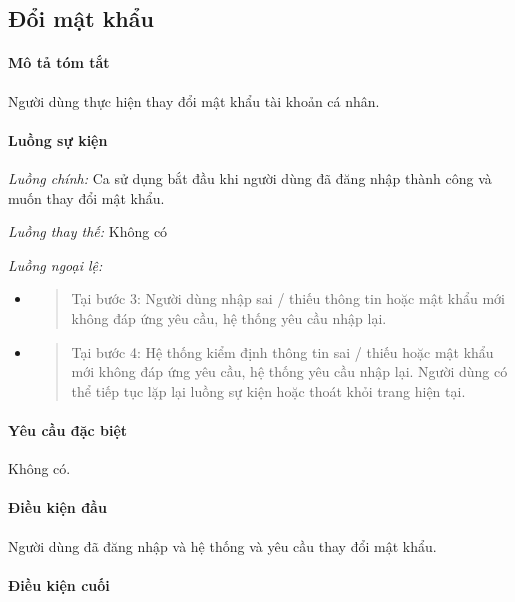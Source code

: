 \documentclass[./../main.tex]{subfiles}
\begin{document}
\subsection{Đổi mật khẩu}

\paragraph*{Mô tả tóm tắt}

Người dùng thực hiện thay đổi mật khẩu tài khoản cá nhân.

\paragraph*{Luồng sự kiện}

\emph{Luồng chính:} Ca sử dụng bắt đầu khi người dùng đã đăng nhập thành công và muốn thay đổi mật khẩu.

\emph{Luồng thay thế:} Không có

\emph{Luồng ngoại lệ:}

\begin{itemize}
\item
  \begin{quote}
  Tại bước 3: Người dùng nhập sai / thiếu thông tin hoặc mật khẩu mới
  không đáp ứng yêu cầu, hệ thống yêu cầu nhập lại.
  \end{quote}
\item
  \begin{quote}
  Tại bước 4: Hệ thống kiểm định thông tin sai / thiếu hoặc mật khẩu mới
  không đáp ứng yêu cầu, hệ thống yêu cầu nhập lại. Người dùng có thể
  tiếp tục lặp lại luồng sự kiện hoặc thoát khỏi trang hiện tại.
  \end{quote}
\end{itemize}

\paragraph*{Yêu cầu đặc biệt}

Không có.

\paragraph*{Điều kiện đầu}

Người dùng đã đăng nhập và hệ thống và yêu cầu thay đổi mật khẩu.

\paragraph*{Điều kiện cuối}
\end{document}
